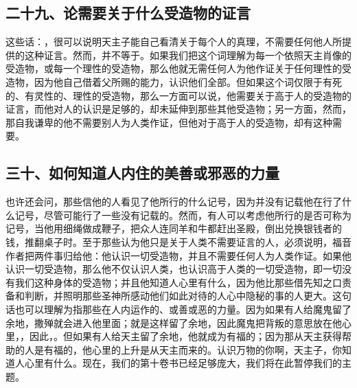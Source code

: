 
\subsection{二十九、论需要关于什么受造物的证言}

这些话：，很可以说明天主子能自己看清关于每个人的真理，不需要任何他人所提供的这种证言。然而，并不等于。如果我们把这个词理解为每一个依照天主肖像的受造物，或每一个理性的受造物，那么他就无需任何人为他作证关于任何理性的受造物，因为他自己借着父所赐的能力，认识他们全部。但如果这个词仅限于有死的、有灵性的、理性的受造物，那么一方面可以说，他需要关于高于人的受造物的证言，而他对人的认识是足够的，却未延伸到那些其他受造物；另一方面，然而，那自我谦卑的他不需要别人为人类作证，但他对于高于人的受造物，却有这种需要。\par


\subsection{三十、如何知道人内住的美善或邪恶的力量}

也许还会问，那些信他的人看见了他所行的什么记号，因为并没有记载他在行了什么记号，尽管可能行了一些没有记载的。然而，有人可以考虑他所行的是否可称为记号，当他用细绳做成鞭子，把众人连同羊和牛都赶出圣殿，倒出兑换银钱者的钱，推翻桌子时。至于那些认为他只是关于人类不需要证言的人，必须说明，福音作者把两件事归给他：他认识一切受造物，并且不需要任何人为人类作证。如果他认识一切受造物，那么他不仅认识人类，也认识高于人类的一切受造物，即一切没有我们这种身体的受造物；并且他知道人心里有什么，因为他比那些借先知之口责备和判断，并照明那些圣神所感动他们如此对待的人心中隐秘的事的人更大。这句话也可以理解为指那些在人内运作的、或善或恶的力量。因为如果有人给魔鬼留了余地，撒殚就会进入他里面；就是这样留了余地，因此魔鬼把背叛的意思放在他心里，，因此，。但如果有人给天主留了余地，他就成为有福的；因为那从天主获得帮助的人是有福的，他心里的上升是从天主而来的。认识万物的你啊，天主子，你知道人心里有什么。现在，我们的第十卷书已经足够庞大，我们将在此暂停我们的主题。\par

